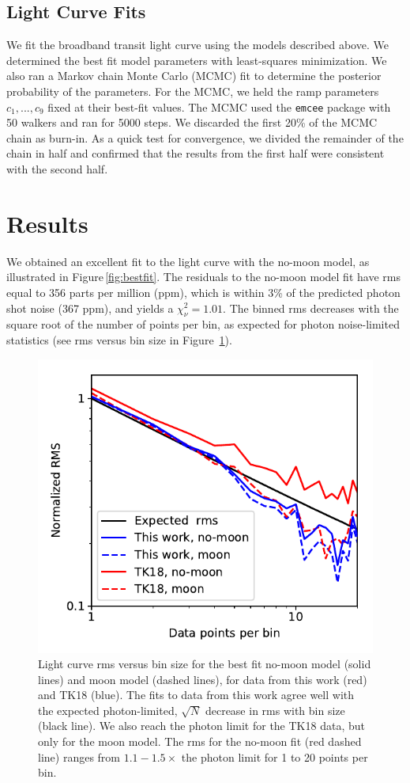 \documentclass[twocolumn,trackchanges]{aastex62}
\begin{document}
\subsection{Light Curve Fits}
We fit the broadband transit light curve using the models described above.  We determined the best fit model parameters with least-squares minimization.  We also ran a Markov chain Monte Carlo (MCMC) fit to determine the posterior probability of the parameters. For the MCMC, we held the ramp parameters $c_1, ..., c_9$ fixed at their best-fit values.  The MCMC used the \texttt{emcee} package \citep{foremanmackey13} with 50 walkers and ran for 5000 steps. We discarded the first 20\% of the MCMC chain as burn-in. As a quick test for convergence, we divided the remainder of the chain in half and confirmed that the results from the first half were consistent with the second half.


\section{Results}
We obtained an excellent fit to the light curve with the no-moon model, as illustrated in  Figure\,\ref{fig:bestfit}. The residuals to the no-moon model fit have rms equal to 356 parts per million (ppm), which is within 3\% of the predicted photon shot noise (367 ppm), and yields a $\chi_\nu^2 = 1.01$. The binned rms decreases with the square root of the number of points per bin, as expected for photon noise-limited statistics (see rms versus bin size in Figure~\ref{fig:rms}).

\begin{figure}
\includegraphics[width = 0.5 \textwidth]{fig4_rms.pdf}
    \caption{Light curve rms versus bin size for the best fit no-moon model (solid lines) and moon model (dashed lines), for data from this work (red) and TK18 (blue). The fits to data from this work agree well with the expected photon-limited, $\sqrt{N}$ decrease in rms with bin size (black line).  We also reach the photon limit for the TK18 data, but only for the moon model. The rms for the no-moon fit (red dashed line) ranges from $1.1 - 1.5\times$ the photon limit for 1 to 20 points per bin.}
 \label{fig:rms}
\end{figure}
\end{document}
